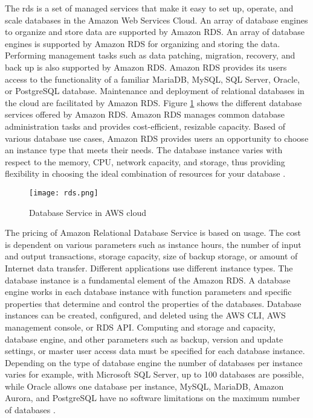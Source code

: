 \par The \gls{rds} is a set of managed services that
make it
easy
to
set up, operate, and scale databases in the Amazon Web Services Cloud.
An array of database engines to organize and store data
are supported by Amazon RDS.
An array of database engines is supported by Amazon RDS for organizing and storing the data.
Performing management tasks such as data patching, migration, recovery, and back up is also supported by Amazon RDS.
Amazon RDS provides its users access to the functionality of a familiar MariaDB, MySQL, SQL Server, Oracle, or PostgreSQL database.
Maintenance and deployment of relational databases in the cloud are facilitated by Amazon RDS.
Figure \ref{fig:rds} shows the different database
services offered by Amazon RDS.
Amazon RDS manages common database administration tasks and provides cost-efficient, resizable capacity.
Based of various database use cases, Amazon RDS provides users an opportunity to choose an instance type that meets their needs.
The database instance varies with respect to the memory,
CPU, network capacity, and storage, thus providing
flexibility in choosing the ideal combination of resources for your database \cite{35}.
\begin{figure}
    \centering
    \texttt{[image: rds.png]}
    \caption{Database Service in AWS cloud}{\cite{36}}
    \label{fig:rds}
\end{figure}

\par The pricing of Amazon Relational Database Service is based on usage.
The cost is dependent on various parameters such as instance hours, the number of input and output transactions, storage capacity, size of backup storage, or amount of Internet data transfer.
Different applications use different instance types.
The database instance is a fundamental element of the
Amazon RDS. A database engine works in each database
instance with function parameters and specific properties
that determine and control the properties of the
databases.
Database instances can be created, configured,
and deleted using the AWS CLI, AWS management console, or
RDS API. Computing and storage and capacity, database
engine, and other parameters such as backup, version and update settings, or master user access data must be specified for each database instance.
Depending on the type of database engine the number of databases per instance varies for example, with Microsoft SQL Server, up to 100 databases are possible, while Oracle allows one database per instance, MySQL, MariaDB, Amazon Aurora, and PostgreSQL have no software limitations on the maximum number of databases \cite{37}.

